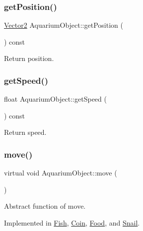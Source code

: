 \subsubsection{\texorpdfstring{get\+Position()}{getPosition()}}
{\footnotesize\ttfamily \mbox{\hyperlink{struct_vector2}{Vector2}} Aquarium\+Object\+::get\+Position (\begin{DoxyParamCaption}{ }\end{DoxyParamCaption}) const}



Return position. 

\mbox{\label{class_aquarium_object_a0e554167f04a77e452d5714d31fadada}} 
\subsubsection{\texorpdfstring{get\+Speed()}{getSpeed()}}
{\footnotesize\ttfamily float Aquarium\+Object\+::get\+Speed (\begin{DoxyParamCaption}{ }\end{DoxyParamCaption}) const}



Return speed. 

\mbox{\label{class_aquarium_object_a42c4de640f89ac8aebc26b7618578575}} 
\subsubsection{\texorpdfstring{move()}{move()}}
{\footnotesize\ttfamily virtual void Aquarium\+Object\+::move (\begin{DoxyParamCaption}{ }\end{DoxyParamCaption})\hspace{0.3cm}{\ttfamily [pure virtual]}}



Abstract function of move. 



Implemented in \mbox{\hyperlink{class_fish_a1a18368573aab3b14a83aaf2424630ec}{Fish}}, \mbox{\hyperlink{class_coin_ab62bca5834489b9b483deaa3ca3470e9}{Coin}}, \mbox{\hyperlink{class_food_afb37f87b673df87697665ae82b6da0da}{Food}}, and \mbox{\hyperlink{class_snail_af5892ec122d9199480c813b74488256b}{Snail}}.

